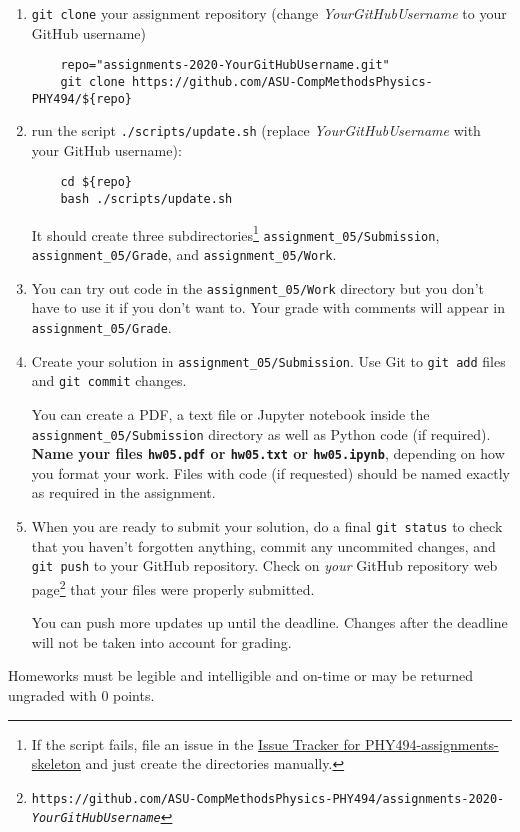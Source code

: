 \documentclass[letterpaper]{scrartcl}
\newcommand{\anumber}{5}
\newcommand{\anum}{0\anumber}
\begin{document}
\begin{enumerate}
\item \texttt{git clone} your assignment repository (change
  \emph{YourGitHubUsername} to your GitHub username)
  \begin{verbatim}
    repo="assignments-2020-YourGitHubUsername.git" 
    git clone https://github.com/ASU-CompMethodsPhysics-PHY494/${repo}
  \end{verbatim}
\item run the script
  \texttt{./scripts/update.sh} (replace \emph{YourGitHubUsername} with
  your GitHub username):
  \begin{verbatim}
    cd ${repo} 
    bash ./scripts/update.sh
  \end{verbatim}
  It should create three subdirectories\footnote{If the script fails,
    file an issue in the
    \href{https://github.com/ASU-CompMethodsPhysics-PHY494/PHY494-assignments-skeleton/issues}{Issue
      Tracker for PHY494-assignments-skeleton} and just create the
    directories manually.} \texttt{assignment\_\anum/Submission},
  \texttt{assignment\_\anum/Grade}, and
  \texttt{assignment\_\anum/Work}.
\item You can try out code in the \texttt{assignment\_\anum/Work}
  directory but you don't have to use it if you don't want to. Your
  grade with comments will appear in
  \texttt{assignment\_\anum/Grade}.
\item Create your solution in
  \texttt{assignment\_\anum/Submission}. Use Git to \texttt{git
    add} files and \texttt{git commit} changes.

  You can create a PDF, a text file or Jupyter notebook inside the
  \texttt{assignment\_\anum/Submission} directory as well as Python
  code (if required). \textbf{Name your files \texttt{hw\anum.pdf} or
    \texttt{hw\anum.txt} or \texttt{hw\anum.ipynb}}, depending on how
  you format your work. Files with code (if requested) should be named
  exactly as required in the assignment.
\item When you are ready to submit your solution, do a final
  \texttt{git status} to check that you haven't forgotten anything,
  commit any uncommited changes, and \texttt{git push} to your GitHub
  repository. Check on \emph{your} GitHub repository web
  page\footnote{\texttt{https://github.com/ASU-CompMethodsPhysics-PHY494/assignments-2020-\emph{YourGitHubUsername}}}
  that your files were properly submitted.

  You can push more updates up until the deadline. Changes after the
  deadline will not be taken into account for grading.
\end{enumerate}
Homeworks must be legible and intelligible and on-time or may  be
returned ungraded with 0 points.
\end{document}
